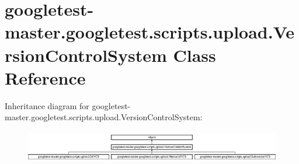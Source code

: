 \hypertarget{classgoogletest-master_1_1googletest_1_1scripts_1_1upload_1_1_version_control_system}{}\section{googletest-\/master.googletest.\+scripts.\+upload.\+Version\+Control\+System Class Reference}
\label{classgoogletest-master_1_1googletest_1_1scripts_1_1upload_1_1_version_control_system}
Inheritance diagram for googletest-\/master.googletest.\+scripts.\+upload.\+Version\+Control\+System\+:\begin{figure}[H]
\begin{center}
\leavevmode
\includegraphics[height=1.421320cm]{d4/d8b/classgoogletest-master_1_1googletest_1_1scripts_1_1upload_1_1_version_control_system}
\end{center}
\end{figure}
